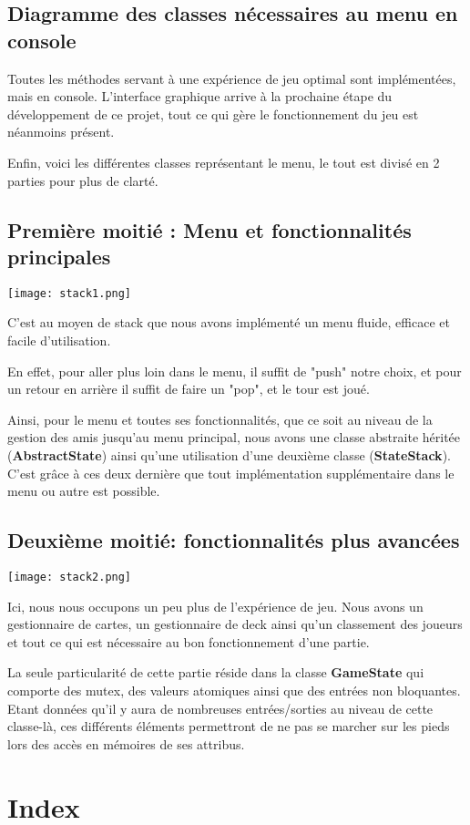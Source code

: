 \documentclass{article}
\begin{document}
		\newpage
		\subsection{Diagramme des classes nécessaires au menu en console}
			Toutes les méthodes servant à une expérience de jeu optimal sont implémentées, mais en console.
			L'interface graphique arrive à la prochaine étape du développement de ce projet, tout ce qui gère le fonctionnement du jeu est néanmoins présent.

			Enfin, voici les différentes classes représentant le menu, le tout est divisé en 2 parties pour plus de clarté.

			\subsection{Première moitié : Menu et fonctionnalités principales}
			\begin{center}\texttt{[image: stack1.png]}\end{center}
				C'est au moyen de stack que nous avons implémenté un menu fluide, efficace et facile d'utilisation.

				En effet, pour aller plus loin dans le menu, il suffit de "push" notre choix, et pour un retour en arrière il suffit de faire un "pop", et le tour est joué. 

				Ainsi, pour le menu et toutes ses fonctionnalités, que ce soit au niveau de la gestion des amis jusqu'au menu principal, 
				nous avons une classe abstraite héritée (\textbf{AbstractState}) ainsi qu'une utilisation d'une deuxième classe (\textbf{StateStack}). C'est grâce à ces deux dernière que tout 
				implémentation supplémentaire dans le menu ou autre est possible.

			\newpage
			\subsection{Deuxième moitié: fonctionnalités plus avancées}
			\begin{center}\texttt{[image: stack2.png]}\end{center}
				Ici, nous nous occupons un peu plus de l'expérience de jeu. Nous avons un gestionnaire de cartes, un gestionnaire de deck ainsi qu'un classement des joueurs 
				et tout ce qui est nécessaire au bon fonctionnement d'une partie.

				La seule particularité de cette partie réside dans la classe \textbf{GameState} qui comporte des mutex, des valeurs atomiques ainsi que des entrées non bloquantes.
				Etant données qu'il y aura de nombreuses entrées/sorties au niveau de cette classe-là, ces différents éléments permettront de ne pas se marcher sur les pieds lors des accès
				en mémoires de ses attribus.

\newpage

\section{Index}
		\printglossary[type=glossary, style=Index, title=]
\end{document}
